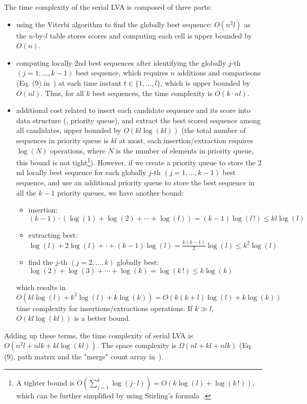The time complexity of the serial LVA is composed of three parts:
\begin{itemize}
\item using the Viterbi algorithm to find the globally best sequence: $O(n^2 l)$ as the $n$-by-$l$ table stores scores and 
      computing each cell is upper bounded by $O(n)$.
\item computing locally $2$nd best sequences after identifying the globally $j$-th $(j=1,\dots,k-1)$ best sequence, 
      which requires $n$ additions and comparisons (Eq. (9) in~\cite{seshadri1994list}) at each time instant $t \in \{1, \dots, l\}$, 
      which is upper bounded by $O(nl)$. Thus, for all $k$ best sequences, the time complexity is $O (k \cdot nl)$.
\item additional cost related to insert each candidate sequence and its score into data structure (\eg, priority queue), 
      and extract the best scored sequence among all candidates, upper bounded by $O \left( kl \log (kl) \right)$ 
      (the total number of sequences in priority queue is $kl$ at most, each insertion/extraction requires $\log (N)$ operations, 
       where $N$ is the number of elements in priority queue, 
       this bound is not tight\footnote{A tighter bound is 
       $O \left( \sum_{j=1}^k \log(j\cdot l) \right) = O( k\log(l) + \log(k\,!) )$, 
       which can be further simplified by using Stirling's formula~\cite{stirling}.\label{foot:bound}}).
      However, if we create a priority queue to store the $2$nd locally best sequence for each globally $j$-th $(j=1,\dots,k-1)$ best sequence,
      and use an additional priority queue to store the best sequence in all the $k-1$ priority queues, 
      we have another bound:
      \begin{itemize}
      \item insertion: $(k-1) \cdot \left( \log(1) + \log(2) + \cdots + \log(l) \right) = (k-1)\log(l\,!) \le kl\log(l)$
      \item extracting best: $\log(l) + 2\log(l) + \cdot + (k-1)\log(l) = \frac{k(k-1)}{2}\log(l) \le k^2 \log(l)$
      \item find the $j$-th $(j=2,\dots,k)$ globally best: $\log(2) + \log(3) + \cdots + \log(k) = \log(k\,!) \le k\log(k)$
      \end{itemize}
      which results in $O \left( kl\log(l) + k^2\log(l) + k\log(k) \right) = O ( k(k+l)\log(l) + k\log(k) ) $
      time complexity for insertions/extractions operations. If $k \gg l$, $O(kl \log(kl))$ is a better bound.
\end{itemize}
Adding up these terms, the time complexity of serial LVA is $O \left( n^2 l + nlk + kl\log(kl) \right)$.
The space complexity is $\Omega(nl + kl + nlk)$ (Eq. (9), path matrix and the "merge" count array in~\cite{seshadri1994list}).


